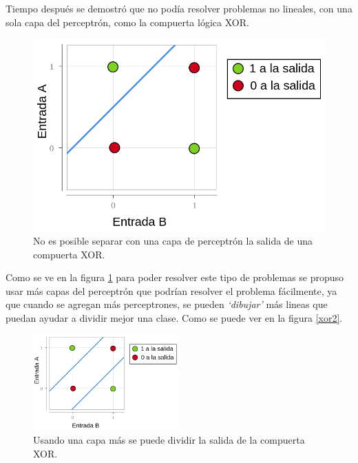 \par Tiempo después se demostró que no podía resolver problemas no lineales, con una sola capa del perceptrón, como la compuerta lógica XOR.
\begin{figure}[H]
	\begin{minipage}{0.5\textwidth}
		
	\end{minipage}%
	\begin{minipage}{0.5\textwidth}
		\includegraphics[width=\textwidth]{imagenes/diagramaXor.png}
	\end{minipage}
	\caption{No es posible separar con una capa de perceptrón la salida de una compuerta XOR.}
	\label{fig:xor}
\end{figure}


\par Como se ve en la figura \ref{fig:xor} para poder resolver este tipo de problemas se propuso usar más capas del perceptrón que podrían resolver el problema fácilmente, ya que cuando se agregan más perceptrones, se pueden \textit{`dibujar'} más lineas que puedan ayudar a dividir mejor una clase. Como se puede ver en la figura \ref{xor2}.

\begin{figure}[H]
	\centering
	\includegraphics[width=0.5\textwidth]{imagenes/diagramaXor2.png}
	\caption{Usando una capa más se puede dividir la salida de la compuerta XOR.}
	\label{fig:xor2}
\end{figure}

